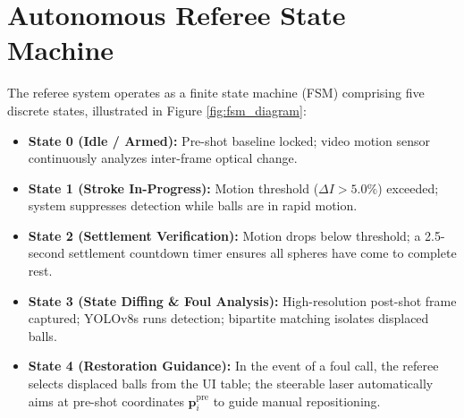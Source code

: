 \section{Autonomous Referee State Machine}
The referee system operates as a finite state machine (FSM) comprising five discrete states, illustrated in Figure \ref{fig:fsm_diagram}:
\begin{itemize}
    \item \textbf{State 0 (Idle / Armed):} Pre-shot baseline locked; video motion sensor continuously analyzes inter-frame optical change.
    \item \textbf{State 1 (Stroke In-Progress):} Motion threshold ($\Delta I > 5.0\%$) exceeded; system suppresses detection while balls are in rapid motion.
    \item \textbf{State 2 (Settlement Verification):} Motion drops below threshold; a 2.5-second settlement countdown timer ensures all spheres have come to complete rest.
    \item \textbf{State 3 (State Diffing \& Foul Analysis):} High-resolution post-shot frame captured; YOLOv8s runs detection; bipartite matching isolates displaced balls.
    \item \textbf{State 4 (Restoration Guidance):} In the event of a foul call, the referee selects displaced balls from the UI table; the steerable laser automatically aims at pre-shot coordinates $\mathbf{p}_i^{\text{pre}}$ to guide manual repositioning.
\end{itemize}

